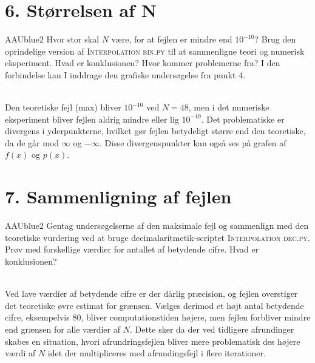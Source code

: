 \section*{6. Størrelsen af N}
%
\begin{color}{AAUblue2} 
Hvor stor skal $N$ være, for at fejlen er mindre end $10^{-10}$? 
Brug den oprindelige version af \textsc{Interpolation bin.py} til at sammenligne teori og numerisk eksperiment. 
Hvad er konklusionen? 
Hvor kommer problemerne fra? 
I den forbindelse kan I inddrage den grafiske undersøgelse fra punkt 4.
\\
\end{color}
\\
%
Den teoretiske fejl (max) bliver $10^{-10}$ ved $N=48$, men i det numeriske eksperiment bliver fejlen aldrig mindre eller lig $10^{-10}$. Det problematiske er divergens i yderpunkterne, hvilket gør fejlen betydeligt større end den teoretiske, da de går mod $ \infty $ og $ - \infty $. Disse divergenspunkter kan også ses på grafen af $f(x)$ og $p(x)$. 
%
\section*{7. Sammenligning af fejlen}
%
\begin{color}{AAUblue2} 
Gentag undersøgelserne af den maksimale fejl og sammenlign med den teoretiske vurdering ved at bruge decimalaritmetik-scriptet \textsc{Interpolation dec.py}. 
Prøv med forskellige værdier for antallet af betydende cifre. 
Hvad er konklusionen?
\\
\end{color}
\\
%
Ved lave værdier af betydende cifre er der dårlig præcision, og fejlen overstiger det teoretiske øvre estimat for grænsen. 
Vælges derimod et højt antal betydende cifre, eksempelvis $80$, bliver computationstiden højere, men fejlen forbliver mindre end grænsen for alle værdier af $N$.
Dette sker da der ved tidligere afrundinger skabes en situation, hvori afrundringsfejlen bliver mere problematisk des højere værdi af $N$ idet der multipliceres med afrundingsfejl i flere iterationer.
